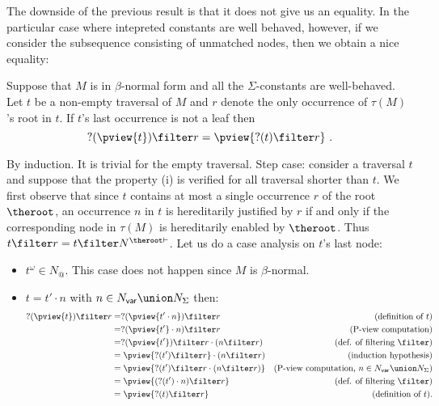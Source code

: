 The downside of the previous result is that it does not give us an
equality. In the particular case where intepreted constants are well
behaved, however, if we consider the subsequence consisting of
unmatched nodes, then we obtain a nice equality:
\begin{lemma}
\label{lem:betanf_wellbehavedconst_trav_pview_red} Suppose that $M$
is in $\beta$-normal form and all the $\Sigma$-constants are
well-behaved. Let $t$ be a non-empty traversal of $M$ and $r$ denote
the only occurrence of $\tau(M)$'s root in $t$. If $t$'s last
occurrence is not a leaf then
$$ ?(\pview{t}) \filter r = \pview{?(t) \filter  r }\ .$$
\end{lemma}
\proof By induction. It is trivial for the empty traversal. Step
case: consider a traversal $t$ and suppose that the property (i) is
verified for all traversal shorter than $t$. We first observe that
since $t$ contains at most a single occurrence $r$ of the root
$\theroot$, an occurrence $n$ in $t$ is hereditarily justified by
$r$ if and only if the corresponding node in $\tau(M)$ is
hereditarily enabled by $\theroot$. Thus $t\filter r = t \filter
N^{\theroot \vdash}$. Let us do a case analysis on $t$'s last node:
\begin{itemize}
\item $t^\omega \in N_@$. This case does not happen since $M$ is $\beta$-normal.

\item $t = t' \cdot n$ with $n \in N_{\sf var} \union N_\Sigma$ then:
    \begin{align*}
    ?(\pview{t}) \filter  r
        &= ?(\pview{t' \cdot n}) \filter  r & (\mbox{definition of } t)\\
        &= ?(\pview{t'} \cdot n) \filter  r  & (\mbox{P-view computation}) \\
        &= ?(\pview{t'}) \filter  r  \cdot (n \filter  r)            & (\mbox{def. of filtering $\filter$}) \\
        &= \pview{?(t') \filter r} \cdot (n \filter  r)           & (\mbox{induction hypothesis}) \\
        &= \pview{?(t') \filter  r \cdot (n \filter  r) } & (\mbox{P-view computation, $n \in N_{\sf var} \union N_{\Sigma}$}) \\
        &= \pview{(?(t') \cdot n ) \filter  r }           & (\mbox{def. of filtering $\filter$}) \\
        &= \pview{?(t) \filter  r  }
 & (\mbox{definition of } t).
    \end{align*}
\end{itemize}
